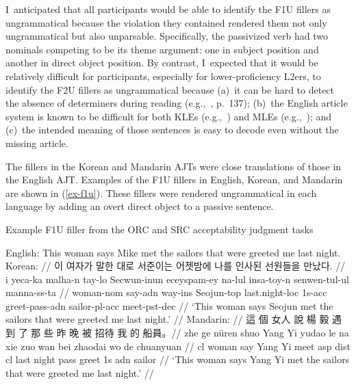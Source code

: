 I~anticipated that all participants would be able to identify the F1U fillers as ungrammatical because the violation they contained rendered them not only ungrammatical but also unparsable. Specifically, the passivized verb had two nominals competing to be its theme argument: one in subject position and another in direct object position. By contrast, I~expected that it would be relatively difficult for participants, especially for lower-proficiency L2ers, to identify the F2U fillers as ungrammatical because (a)~it can be hard to detect the absence of determiners during reading (e.g.,~\cite{ionin.etal2021}, p.~137); (b)~the English article system is known to be difficult for both KLEs (e.g.,~\cite{ionin.etal2004}) and MLEs (e.g.,~\cite{trenkic2008}); and (c)~the intended meaning of those sentences is easy to decode even without the missing article.

The fillers in the Korean and Mandarin AJTs were close translations of those in the English AJT. Examples of the F1U fillers in English, Korean, and Mandarin are shown in (\ref{ex-f1u}). These fillers were rendered ungrammatical in each language by adding an overt direct object to a passive sentence. 

\pex Example F1U filler from the ORC and SRC acceptability judgment tasks \label{ex-f1u} \par\nobreak
\a English:\vspace{2pt}\newline
\ljudge*This woman says Mike met the sailors that were greeted me last night.
\a 
\begingl
\glpreamble Korean: //
\gla \ljudge*\ko 이 \ko 여자가 \ko 말한 \ko 대로 \ko 서준이는 \ko 어젯밤에 \ko 나를 \ko 인사된 \ko 선원들을 \ko 만났다. //
\glb i yeca-ka malha-n tay-lo Secwun-inun eceyspam-ey na-lul insa-toy-n senwen-tul-ul manna-ss-ta //
 woman-{\sc nom} say-{\sc adn} way-{\sc ins} Seojun-{\sc top} last.night-{\sc loc} {\sc 1s-acc} greet-{\sc pass-adn} sailor-{\sc pl-acc} meet-{\sc pst-dec} //
\glft \ljudge*`This woman says Seojun met the sailors that were greeted me last night.' //
\endgl 
\a 
\begingl
\glpreamble Mandarin: //
\gla \ljudge*\zh 這 \zh 個 \zh 女人 \zh 說 \zh 楊 \zh 毅 \zh 遇到 \zh 了 \zh 那 \zh 些 \zh 昨 \zh 晚 \zh 被 \zh 招待 \zh 我 \zh 的 \zh 船員。//
\glb zhe ge nüren shuo Yang Yi yudao le na xie zuo wan bei zhaodai wo de chuanyuan //
 {\sc cl} woman say Yang Yi meet {\sc asp} {\sc dist} {\sc cl} last night {\sc pass} greet {\sc 1s} {\sc adn} sailor //
\glft \ljudge* `This woman says Yang Yi met the sailors that were greeted me last night.' //
\endgl 
\xe 

